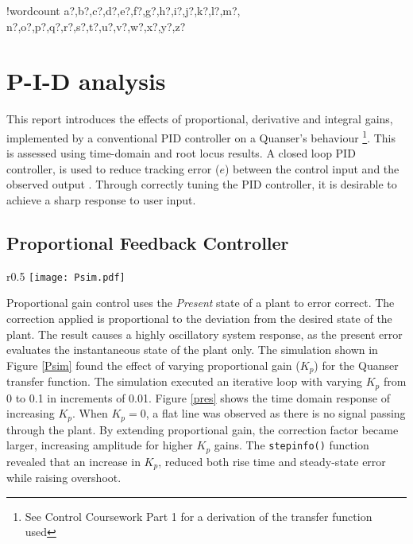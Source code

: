 \documentclass[11pt]{article}
\newcounter{words}
\newenvironment{counted}{%
  \setcounter{words}{0}
  \SearchList!{wordcount}{\stepcounter{words}}
    {a?,b?,c?,d?,e?,f?,g?,h?,i?,j?,k?,l?,m?,
    n?,o?,p?,q?,r?,s?,t?,u?,v?,w?,x?,y?,z?}
  \UndoBoundary{'}
  \SearchOrder{p;}}{%
  \StopSearching}
\begin{document}
\clearpage
{}
\begin{counted} %
\section{P-I-D analysis}\label{p-i-d-analysis}

This report introduces the effects of proportional, derivative and
integral gains, implemented by a conventional PID controller on a
Quanser's behaviour
\footnote{See Control Coursework Part 1 for a derivation of the transfer function used}.
This is assessed using time-domain and root locus results. A closed loop
PID controller, is used to reduce tracking error (\(e\)) between the
control input and the observed output \cite{ControlT54:online}. Through
correctly tuning the PID controller, it is desirable to achieve a sharp
response to user input.

\subsection{Proportional Feedback
Controller}\label{proportional-feedback-controller}

\begin{wrapfigure}{r}{0.5\textwidth}
\centering
\vspace{-35pt} %
\texttt{[image: Psim.pdf]}
\vspace{-25pt}
\caption{Proportional Feedback Controller}
\label{Psim}
\vspace{-15pt}
\end{wrapfigure}

Proportional gain control uses the \emph{Present} state of a plant to
error correct. The correction applied is proportional to the deviation
from the desired state of the plant. The result causes a highly
oscillatory system response, as the present error evaluates the
instantaneous state of the plant only. The simulation shown in Figure
\ref{Psim} found the effect of varying proportional gain (\(K_p\)) for
the Quanser transfer function. The simulation executed an iterative loop
with varying \(K_p\) from 0 to 0.1 in increments of 0.01. Figure
\ref{pres} shows the time domain response of increasing \(K_p\). When
\(K_p = 0\), a flat line was observed as there is no signal passing
through the plant. By extending proportional gain, the correction factor
became larger, increasing amplitude for higher \(K_p\) gains. The
\texttt{stepinfo()} function revealed that an increase in \(K_p\),
reduced both rise time and steady-state error while raising overshoot.


\end{counted}
\end{document}
